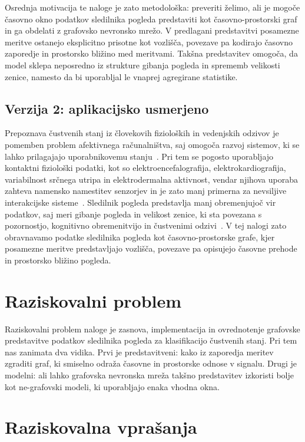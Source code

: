 Osrednja motivacija te naloge je zato metodološka: preveriti želimo, ali je mogoče časovno okno podatkov sledilnika pogleda predstaviti kot časovno-prostorski graf in ga obdelati z grafovsko nevronsko mrežo.
V predlagani predstavitvi posamezne meritve ostanejo eksplicitno prisotne kot vozlišča, povezave pa kodirajo časovno zaporedje in prostorsko bližino med meritvami.
Takšna predstavitev omogoča, da model sklepa neposredno iz strukture gibanja pogleda in sprememb velikosti zenice, namesto da bi uporabljal le vnaprej agregirane statistike.

\subsection{Verzija 2: aplikacijsko usmerjeno}

Prepoznava čustvenih stanj iz človekovih fizioloških in vedenjskih odzivov je pomemben problem afektivnega računalništva, saj omogoča razvoj sistemov, ki se lahko prilagajajo uporabnikovemu stanju~\cite{ref}.
Pri tem se pogosto uporabljajo kontaktni fiziološki podatki, kot so elektroencefalografija, elektrokardiografija, variabilnost srčnega utripa in elektrodermalna aktivnost, vendar njihova uporaba zahteva namensko namestitev senzorjev in je zato manj primerna za nevsiljive interakcijske sisteme~\cite{ref}.
Sledilnik pogleda predstavlja manj obremenjujoč vir podatkov, saj meri gibanje pogleda in velikost zenice, ki sta povezana s pozornostjo, kognitivno obremenitvijo in čustvenimi odzivi~\cite{ref}.
V tej nalogi zato obravnavamo podatke sledilnika pogleda kot časovno-prostorske grafe, kjer posamezne meritve predstavljajo vozlišča, povezave pa opisujejo časovne prehode in prostorsko bližino pogleda.

\section{Raziskovalni problem}
\label{subsec:raziskovalni-problem}

Raziskovalni problem naloge je zasnova, implementacija in ovrednotenje grafovske predstavitve podatkov sledilnika pogleda za klasifikacijo čustvenih stanj.
Pri tem nas zanimata dva vidika.
Prvi je predstavitveni: kako iz zaporedja meritev zgraditi graf, ki smiselno odraža časovne in prostorske odnose v signalu.
Drugi je modelni: ali lahko grafovska nevronska mreža takšno predstavitev izkoristi bolje kot ne-grafovski modeli, ki uporabljajo enaka vhodna okna.

\section{Raziskovalna vprašanja}
\label{subsec:raziskovalna-vprasanja}

